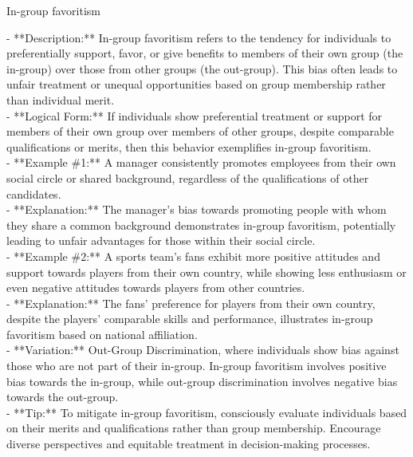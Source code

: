 \documentclass[a4paper,12pt,single,pdftex]{scrartcl}
\begin{document}
In-group favoritism
    
      - **Description:** In-group favoritism refers to the tendency for individuals to preferentially support, favor, or give benefits to members of their own group (the in-group) over those from other groups (the out-group). This bias often leads to unfair treatment or unequal opportunities based on group membership rather than individual merit.
    \\

    
      - **Logical Form:** If individuals show preferential treatment or support for members of their own group over members of other groups, despite comparable qualifications or merits, then this behavior exemplifies in-group favoritism.
    \\

    
      - **Example \#1:** A manager consistently promotes employees from their own social circle or shared background, regardless of the qualifications of other candidates.
    \\

    
      - **Explanation:** The manager’s bias towards promoting people with whom they share a common background demonstrates in-group favoritism, potentially leading to unfair advantages for those within their social circle.
    \\

    
      - **Example \#2:** A sports team’s fans exhibit more positive attitudes and support towards players from their own country, while showing less enthusiasm or even negative attitudes towards players from other countries.
    \\

    
      - **Explanation:** The fans’ preference for players from their own country, despite the players’ comparable skills and performance, illustrates in-group favoritism based on national affiliation.
    \\

    
      - **Variation:** Out-Group Discrimination, where individuals show bias against those who are not part of their in-group. In-group favoritism involves positive bias towards the in-group, while out-group discrimination involves negative bias towards the out-group.
    \\

    
      - **Tip:** To mitigate in-group favoritism, consciously evaluate individuals based on their merits and qualifications rather than group membership. Encourage diverse perspectives and equitable treatment in decision-making processes.
    \\
\end{document}
